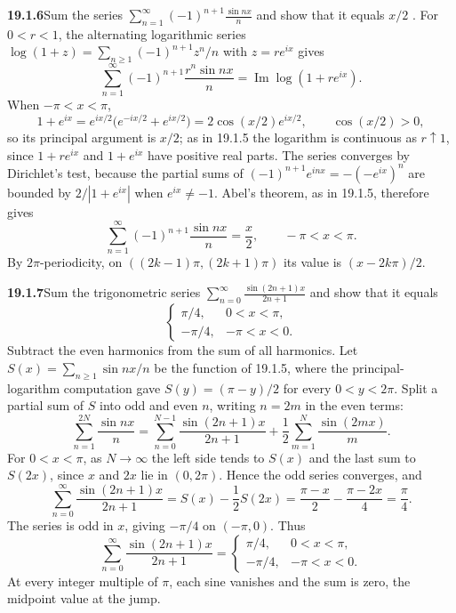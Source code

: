 \par\bigskip
\noindent\textbf{19.1.6}\quad Sum the series
$\displaystyle\sum_{n=1}^{\infty}(-1)^{n+1}\frac{\sin nx}{n}$ and
show that it equals $x/2$ .
\solution
For $0<r<1$, the alternating logarithmic series
$\log(1+z)=\sum_{n\ge1}(-1)^{n+1}z^n/n$ with $z=re^{ix}$ gives
\[
\sum_{n=1}^{\infty}(-1)^{n+1}\frac{r^n\sin nx}{n}
=\operatorname{Im}\log(1+re^{ix}).
\]
When $-\pi<x<\pi$,
\[
1+e^{ix}=e^{ix/2}\bigl(e^{-ix/2}+e^{ix/2}\bigr)
=2\cos(x/2)e^{ix/2},\qquad \cos(x/2)>0,
\]
so its principal argument is $x/2$; as in 19.1.5 the logarithm is
continuous as $r\uparrow1$, since $1+re^{ix}$ and $1+e^{ix}$ have
positive real parts. The series converges by Dirichlet's test, because
the partial sums of $(-1)^{n+1}e^{inx}=-(-e^{ix})^n$ are bounded by
$2/|1+e^{ix}|$ when $e^{ix}\ne-1$. Abel's theorem, as in 19.1.5,
therefore gives
\[
\boxed{\sum_{n=1}^{\infty}(-1)^{n+1}\frac{\sin nx}{n}=\frac{x}{2},
\qquad -\pi<x<\pi.}
\]
By $2\pi$-periodicity, on $((2k-1)\pi,(2k+1)\pi)$ its value is
$(x-2k\pi)/2$.

\par\bigskip
\noindent\textbf{19.1.7}\quad Sum the trigonometric series
$\displaystyle\sum_{n=0}^{\infty}\frac{\sin(2n+1)x}{2n+1}$ and show
that it equals
\[
\begin{cases}
\pi/4, & 0<x<\pi,\\
-\pi/4, & -\pi<x<0.
\end{cases}
\]
\solution
Subtract the even harmonics from the sum of all harmonics. Let
$S(x)=\sum_{n\ge1}\sin nx/n$ be the function of 19.1.5, where the
principal-logarithm computation gave $S(y)=(\pi-y)/2$ for every
$0<y<2\pi$. Split a partial sum of $S$ into odd and even $n$, writing
$n=2m$ in the even terms:
\[
\sum_{n=1}^{2N}\frac{\sin nx}{n}
=\sum_{n=0}^{N-1}\frac{\sin(2n+1)x}{2n+1}
+\frac12\sum_{m=1}^{N}\frac{\sin(2mx)}{m}.
\]
For $0<x<\pi$, as $N\to\infty$ the left side tends to $S(x)$ and the
last sum to $S(2x)$, since $x$ and $2x$ lie in $(0,2\pi)$. Hence the odd
series converges, and
\[
\sum_{n=0}^{\infty}\frac{\sin(2n+1)x}{2n+1}
=S(x)-\frac12S(2x)
=\frac{\pi-x}{2}-\frac{\pi-2x}{4}=\frac\pi4.
\]
The series is odd in $x$, giving $-\pi/4$ on $(-\pi,0)$. Thus
\[
\boxed{\sum_{n=0}^{\infty}\frac{\sin(2n+1)x}{2n+1}
=\begin{cases}\pi/4,&0<x<\pi,\\-\pi/4,&-\pi<x<0.\end{cases}}
\]
At every integer multiple of $\pi$, each sine vanishes and the sum is
zero, the midpoint value at the jump.

